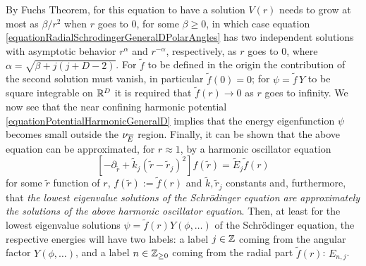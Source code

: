 By Fuchs Theorem, for this equation to have a solution $V(r)$ needs to grow at most as $\beta/r^2$ when $r$ goes to $0$, for some $\beta \geq 0$, in which case equation \eqref{equationRadialSchrodingerGeneralDPolarAngles} has two independent solutions with asymptotic behavior $r^\alpha$ and $r^{-\alpha}$, respectively, as $r$ goes to $0$, where $\alpha = \sqrt{\beta + j(j+D-2)}$. For $\tilde f$ to be defined in the origin the contribution of the second solution must vanish, in particular $\tilde f(0) = 0$; for $\psi = \tilde f\, Y$ to be square integrable on $\mathbb{R}^D$ it is required that $\tilde f(r) \to 0$ as $r$ goes to infinity.
We now see that the near confining harmonic potential \eqref{equationPotentialHarmonicGeneralD} implies that the energy eigenfunction $\psi$ becomes small outside the $\nu_{\overline{E}}$ region.
Finally, it can be shown \cite{Fiore2019} that the above equation can be approximated, for $r \approx 1$, by a harmonic oscillator equation
\begin{equation} \label{harmonicApproximationRadialSolutionGeneralD}
    [- \partial_{\tilde r} + \tilde k_j(\tilde r - \tilde r_{j})^2] f(\tilde r) = \tilde E_j \tilde f(r)
\end{equation} 
for some $\tilde r$ function of $r$, $f(\tilde r) := \tilde f(r)$ and $\tilde k, \tilde r_j$ constants and, furthermore, that \emph{the lowest eigenvalue solutions of the Schr\"odinger equation are approximately the solutions of the above harmonic oscillator equation}. Then, at least for the lowest eigenvalue solutions $\psi = \tilde f(r) Y(\phi, \dots)$ of the Schr\"odinger equation, the respective energies will have two labels: a label $j \in \mathbb{Z}$ coming from the angular factor $Y(\phi, \dots)$, and a label $n \in \mathbb{Z}_{\geq 0}$ coming from the radial part $\tilde f(r)$: $E_{n, j}$.

\lin

